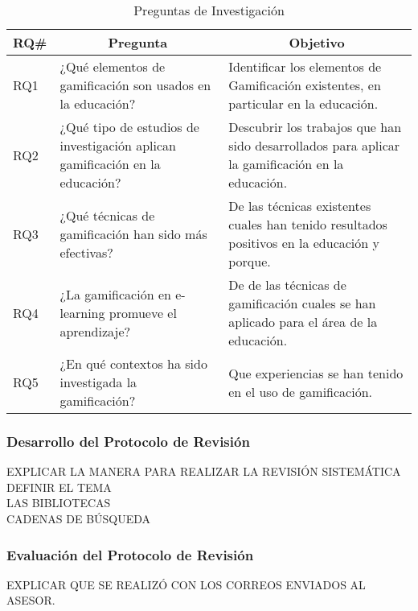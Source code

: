 \documentclass[•]{article}
\begin{document}
\begin{table}
    \begin{center}
        \caption{Preguntas de Investigación}
        \label{table:researchQuestions}
        \begin{tabular}{| p{0.6cm} | p{3.5cm} | p{3.5cm} |}
            \toprule
            \hline
            \multicolumn{1}{|c|}{\textbf{RQ\#}} & \multicolumn{1}{|c|}{\textbf{Pregunta}}  & \multicolumn{1}{|c|}{\textbf{Objetivo}} \\
            \hline
            RQ1 & ¿Qué elementos de gamificación son usados en la educación? & Identificar los elementos de Gamificación existentes, en particular en la educación. \\
            \hline
            RQ2 & ¿Qué tipo de estudios de investigación aplican gamificación en la educación? & Descubrir los trabajos que han sido desarrollados para aplicar la gamificación en la educación. \\
            \hline
            RQ3 & ¿Qué técnicas de gamificación han sido más efectivas? & De las técnicas existentes cuales han tenido resultados positivos en la educación y porque. \\
            \hline
            RQ4 & ¿La gamificación en e-learning promueve el aprendizaje? & De de las técnicas de gamificación cuales se han aplicado para el área de la educación.\\
            \hline
            RQ5 & ¿En qué contextos ha sido investigada la gamificación? & Que experiencias se han tenido en el uso de gamificación.\\
            \hline
        \end{tabular}
    \end{center}
\end{table}

    \subsubsection{Desarrollo del Protocolo de Revisión}
    EXPLICAR LA MANERA PARA REALIZAR LA REVISIÓN SISTEMÁTICA\\
    DEFINIR EL TEMA\\
    LAS BIBLIOTECAS\\
    CADENAS DE BÚSQUEDA\\

    \subsubsection{Evaluación del Protocolo de Revisión}
    EXPLICAR QUE SE REALIZÓ CON LOS CORREOS ENVIADOS AL ASESOR.\\
    
\end{document}
